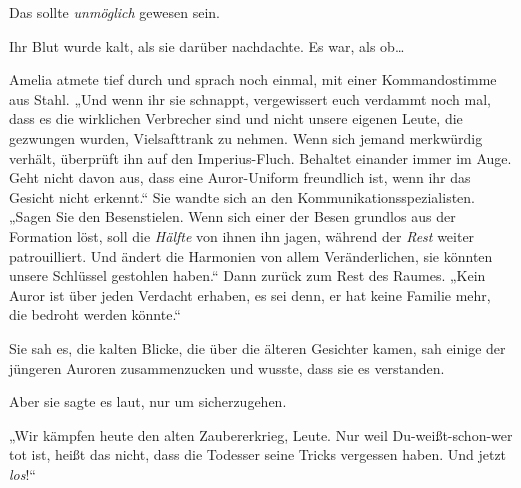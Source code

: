Das sollte \emph{unmöglich} gewesen sein.

Ihr Blut wurde kalt, als sie darüber nachdachte. Es war, als ob…

Amelia atmete tief durch und sprach noch einmal, mit einer Kommandostimme aus Stahl. „Und wenn ihr sie schnappt, vergewissert euch verdammt noch mal, dass es die wirklichen Verbrecher sind und nicht unsere eigenen Leute, die gezwungen wurden, Vielsafttrank zu nehmen. Wenn sich jemand merkwürdig verhält, überprüft ihn auf den Imperius-Fluch. Behaltet einander immer im Auge. Geht nicht davon aus, dass eine Auror-Uniform freundlich ist, wenn ihr das Gesicht nicht erkennt.“ Sie wandte sich an den Kommunikationsspezialisten. „Sagen Sie den Besenstielen. Wenn sich einer der Besen grundlos aus der Formation löst, soll die \emph{Hälfte} von ihnen ihn jagen, während der \emph{Rest} weiter patrouilliert. Und ändert die Harmonien von allem Veränderlichen, sie könnten unsere Schlüssel gestohlen haben.“ Dann zurück zum Rest des Raumes. „Kein Auror ist über jeden Verdacht erhaben, es sei denn, er hat keine Familie mehr, die bedroht werden könnte.“

Sie sah es, die kalten Blicke, die über die älteren Gesichter kamen, sah einige der jüngeren Auroren zusammenzucken und wusste, dass sie es verstanden.

Aber sie sagte es laut, nur um sicherzugehen.

„Wir kämpfen heute den alten Zaubererkrieg, Leute. Nur weil Du-weißt-schon-wer tot ist, heißt das nicht, dass die Todesser seine Tricks vergessen haben. Und jetzt \emph{los}!“

